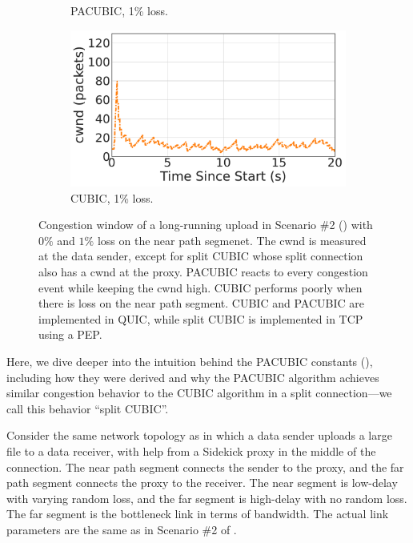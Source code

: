 \begin{figure}[ht]
\begin{subfigure}{0.32\linewidth}
  \caption{PACUBIC, 1\% loss.}
  \label{fig:time-cwnd:pacubic-loss1p}
\end{subfigure}
\begin{subfigure}{0.32\linewidth}
  \includegraphics[width=\linewidth]{sidekick/figures/cwnd_cubic_loss1p.pdf}
  \caption{CUBIC, 1\% loss.}
  \label{fig:time-cwnd:cubic-loss1p}
\end{subfigure}
\caption{Congestion window of a long-running upload in Scenario \#2
() with $0\%$ and $1\%$ loss on the near
path segmenet.
The cwnd is measured at the data sender,
except for split CUBIC whose split connection also has a cwnd at the proxy.
PACUBIC reacts to every congestion event while keeping the cwnd high.
CUBIC performs poorly when there is loss on the near path segment.
CUBIC and PACUBIC are implemented in QUIC, while split CUBIC is implemented
in TCP using a PEP.
}
\label{fig:time-cwnd}
\end{figure}

Here, we dive deeper into the intuition behind the PACUBIC constants
(), including how they were derived and why the PACUBIC
algorithm achieves similar congestion behavior to the CUBIC algorithm in a split
connection---we call this behavior ``split CUBIC''.

Consider the same network topology as  in which a
data sender uploads a large file to a data receiver, with help from a Sidekick
proxy in the middle of the connection. The near path segment connects the sender
to the proxy, and the far path segment connects the proxy to the receiver.
The near segment is low-delay with varying random loss, and the far segment is
high-delay with no random loss. The far segment is the bottleneck link in terms
of bandwidth.
The actual link parameters are the same as in Scenario \#2 of
.

